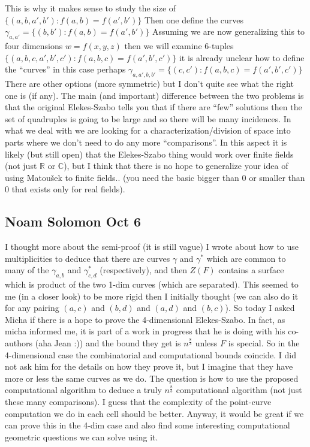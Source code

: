 This is why it makes sense to study the size of $\{(a,b,a',b'): f(a,b)=f(a',b')\}$
Then one define the curves $\gamma_{a,a'} = \{(b,b'): f(a,b)=f(a',b')\}$
Assuming we are now generalizing this to four dimensions
$w=f(x,y,z)$
then we will examine 6-tuples $\{(a,b,c,a',b',c'): f(a,b,c)=f(a',b',c')\}$
it is already unclear how to define the ``curves'' in this case
perhaps $\gamma_{a,a',b,b'} = \{(c,c'): f(a,b,c)=f(a',b',c')\}$
There are other options (more symmetric) but I don't quite see what the
right one is (if any).
The main (and important) difference between the two problems is that the
original Elekes-Szabo tells you that if there are ``few'' solutions then
the set of quadruples is going to be large and so there will be many
incidences. In what we deal with we are looking for a
characterization/division of space into parts where we don't need to do any
more ``comparisons''. In this aspect it is likely (but still open) that the
Elekes-Szabo thing would work over finite fields (not just $\mathbb{R}$ or
$\mathbb{C}$), but I
think that there is no hope to generalize your idea of using Matou\v{s}ek to
finite fields.. (you need the basic bigger than 0 or smaller than 0 that
exists only for real fields).

\subsection{Noam Solomon Oct 6}
I thought more about the semi-proof (it is still vague) I wrote about how
to use multiplicities to deduce that there are curves $\gamma$ and $\gamma^*$
which are common to many of the $\gamma_{a,b}$ and $\gamma^*_{c,d}$
(respectively), and then $Z(F)$ contains a surface which is product of the
two 1-dim curves (which are separated). This seemed to me (in a closer
look) to be more rigid then I initially thought (we can also do it for any
pairing $(a,c)$ and $(b,d)$ and $(a,d)$ and $(b,c)$).
So today I asked Micha if there is a hope to prove the 4-dimensional
Elekes-Szabo.
In fact, as micha informed me, it is part of a work in progress that he is
doing with his co-authors (aha Jean :)) and the bound they get is
$n^{\frac{8}{3}}$
unless $F$ is special. So in the 4-dimensional case the combinatorial and
computational bounds coincide.
I did not ask him for the details on how they prove it, but I imagine that
they have more or less the same curves as we do.
The question is how to use the proposed computational algorithm to deduce a
truly $n^{\frac{8}{3}}$ computational algorithm (not just these many comparisons). I
guess that the complexity of the point-curve computation we do in each cell
should be better.
Anyway, it would be great if we can prove this in the 4-dim case and also
find some interesting computational geometric questions we can solve using
it.

